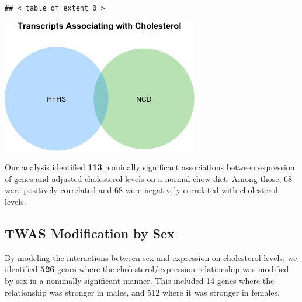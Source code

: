 \documentclass[
]{article}
\newenvironment{Shaded}{\begin{snugshade}}{\end{snugshade}}
\newcommand{\AttributeTok}[1]{\textcolor[rgb]{0.77,0.63,0.00}{#1}}
\newcommand{\DecValTok}[1]{\textcolor[rgb]{0.00,0.00,0.81}{#1}}
\newcommand{\FunctionTok}[1]{\textcolor[rgb]{0.00,0.00,0.00}{#1}}
\newcommand{\NormalTok}[1]{#1}
\newcommand{\OtherTok}[1]{\textcolor[rgb]{0.56,0.35,0.01}{#1}}
\newcommand{\SpecialCharTok}[1]{\textcolor[rgb]{0.00,0.00,0.00}{#1}}
\newcommand{\StringTok}[1]{\textcolor[rgb]{0.31,0.60,0.02}{#1}}
\begin{document}
\begin{verbatim}
## < table of extent 0 >
\end{verbatim}

\begin{Shaded}
\end{Shaded}

\includegraphics{figures/cholesterol-twas-hf-1.png}

Our analysis identified \textbf{113} nominally significant associations
between expression of genes and adjusted cholesterol levels on a normal
chow diet. Among those, 68 were positively correlated and 68 were
negatively correlated with cholesterol levels.

\hypertarget{twas-modification-by-sex}{%
\subsection{TWAS Modification by Sex}\label{twas-modification-by-sex}}

By modeling the interactions between sex and expression on cholesterol
levels, we identified \textbf{526} genes where the
cholesterol/expression relationship was modified by sex in a nominally
significant manner. This included 14 genes where the relationship was
stronger in males, and 512 where it was stronger in females.
\end{document}
